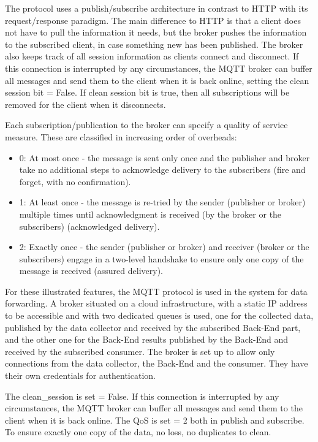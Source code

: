 The protocol uses a publish/subscribe architecture in contrast to HTTP with its request/response paradigm. The main difference to HTTP is that a client does not have to pull the information it needs, but the broker pushes the information to the subscribed client, in case something new has been published. The broker also keeps track of all session information as clients connect and disconnect. If this connection is interrupted by any circumstances, the MQTT broker can buffer all messages and send them to the client when it is back online, setting the clean session bit = False. If clean session bit is true, then all subscriptions will be removed for the client when it disconnects.

Each subscription/publication to the broker can specify a quality of service measure. These are classified in increasing order of overheads:
\begin{itemize}
  \item 0: At most once - the message is sent only once and the publisher and broker take no additional steps to acknowledge delivery to the subscribers (fire and forget, with no confirmation).
  \item 1: At least once - the message is re-tried by the sender (publisher or broker) multiple times until acknowledgment is received (by the broker or the subscribers) (acknowledged delivery).
  \item 2: Exactly once - the sender (publisher or broker) and receiver (broker or the subscribers) engage in a two-level handshake to ensure only one copy of the message is received (assured delivery).
\end{itemize}

For these illustrated features, the MQTT protocol is used in the system for data forwarding. A broker situated on a cloud infrastructure, with a static IP address to be accessible and with two dedicated queues is used, one for the collected data, published by the data collector and received by the subscribed Back-End part, and the other one for the Back-End results published by the Back-End and received by the subscribed consumer.
The broker is set up to allow only connections from the data collector, the Back-End and the consumer. They have their own credentials for authentication.

The clean\_session is set = False. If this connection is interrupted by any circumstances, the MQTT broker can buffer all messages and send them to the client when it is back online.
The QoS is set = 2 both in publish and subscribe. To ensure exactly one copy of the data, no loss, no duplicates to clean.


